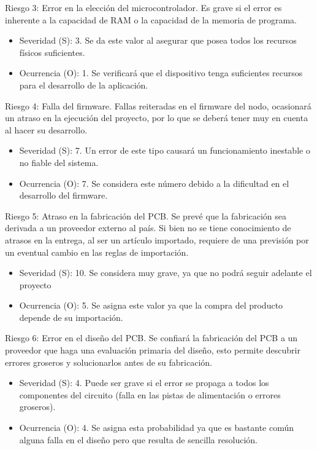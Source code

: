 \documentclass[11pt]{proyecto}
\begin{document}
Riesgo 3: Error en la elección del microcontrolador. Es grave si el error es inherente a la capacidad de RAM o la capacidad de la memoria de programa.
\begin{itemize}
\item Severidad (S): 3. Se da este valor al asegurar que posea todos los recursos físicos suficientes.
\item Ocurrencia (O): 1. Se verificará que el dispositivo tenga suficientes recursos para el desarrollo de la aplicación.
\end{itemize}

Riesgo 4: Falla del firmware. Fallas reiteradas en el firmware del nodo, ocasionará un atraso en la ejecución del proyecto, por lo que se deberá tener muy en cuenta al hacer su desarrollo. 
\begin{itemize}
\item Severidad (S): 7. Un error de este tipo causará un funcionamiento inestable o no fiable del sistema.
\item Ocurrencia (O): 7. Se considera este número debido a la dificultad en el desarrollo del firmware.
\end{itemize}

Riesgo 5: Atraso en la fabricación del PCB. Se prevé que la fabricación sea derivada a un proveedor externo al país. Si bien no se tiene conocimiento de atrasos en la entrega, al ser un artículo importado, requiere de una previsión por un eventual cambio en las reglas de importación.
\begin{itemize}
\item Severidad (S): 10. Se considera muy grave, ya que no podrá seguir adelante el proyecto
\item Ocurrencia (O): 5. Se asigna este valor ya que la compra del producto depende de su importación.
\end{itemize}

Riesgo 6: Error en el diseño del PCB. Se confiará la fabricación del PCB a un proveedor que haga una evaluación primaria del diseño, esto permite descubrir errores groseros y solucionarlos antes de su fabricación.
\begin{itemize}
\item Severidad (S): 4. Puede ser grave si el error se propaga a todos los componentes del circuito (falla en las pistas de alimentación o errores groseros).
\item Ocurrencia (O): 4. Se asigna esta probabilidad ya que es bastante común alguna falla en el diseño pero que resulta de sencilla resolución.
\end{itemize}
\end{document}
